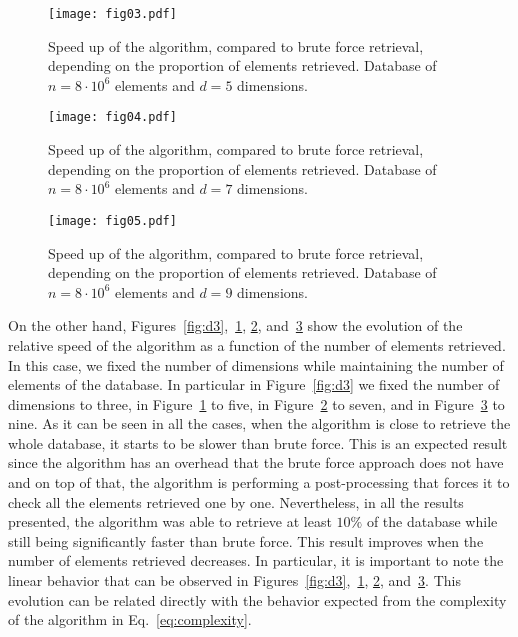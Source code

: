 \documentclass[review]{elsarticle}
\begin{document}
\begin{figure}[h!]
	\centering
	\texttt{[image: fig03.pdf]}
	\caption{Speed up of the algorithm, compared to brute force retrieval, depending on the proportion of elements retrieved. Database of $n = 8\cdot 10^{6}$ elements and $d=5$ dimensions.}
	\label{fig:d5}
\end{figure}

\begin{figure}[h!]
	\centering
	\texttt{[image: fig04.pdf]}
	\caption{Speed up of the algorithm, compared to brute force retrieval, depending on the proportion of elements retrieved. Database of $n = 8\cdot 10^{6}$ elements and $d=7$ dimensions.}
	\label{fig:d7}
\end{figure}

\begin{figure}[h!]
	\centering
	\texttt{[image: fig05.pdf]}
	\caption{Speed up of the algorithm, compared to brute force retrieval, depending on the proportion of elements retrieved. Database of $n = 8\cdot 10^{6}$ elements and $d=9$ dimensions.}
	\label{fig:d9}
\end{figure}

On the other hand, Figures~\ref{fig:d3},~\ref{fig:d5}, \ref{fig:d7}, and~\ref{fig:d9} show the evolution of the relative speed of the algorithm as a function of the number of elements retrieved. In this case, we fixed the number of dimensions while maintaining the number of elements of the database. In particular in Figure~\ref{fig:d3} we fixed the number of dimensions to three, in Figure~\ref{fig:d5} to five, in Figure~\ref{fig:d7} to seven, and in Figure~\ref{fig:d9} to nine. As it can be seen in all the cases, when the algorithm is close to retrieve the whole database, it starts to be slower than brute force. This is an expected result since the algorithm has an overhead that the brute force approach does not have and on top of that, the algorithm is performing a post-processing that forces it to check all the elements retrieved one by one. Nevertheless, in all the results presented, the algorithm was able to retrieve at least $10\%$ of the database while still being significantly faster than brute force. This result improves when the number of elements retrieved decreases. In particular, it is important to note the linear behavior that can be observed in Figures~\ref{fig:d3},~\ref{fig:d5}, \ref{fig:d7}, and~\ref{fig:d9}. This evolution can be related directly with the behavior expected from the complexity of the algorithm in Eq.~\eqref{eq:complexity}.
\end{document}
